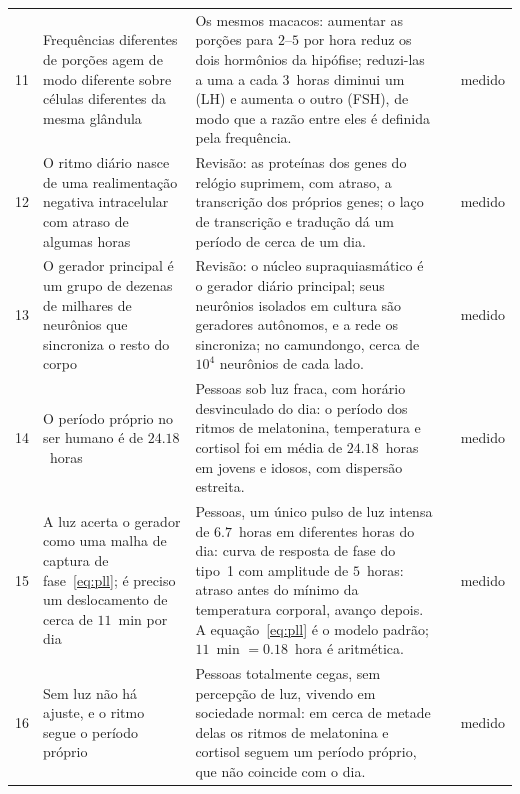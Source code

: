 {\begin{longtable}{>{\raggedright}p{0.5cm}>{\raggedright}p{4.0cm}>{\raggedright}p{5.6cm}>{\raggedright}p{2.3cm}>{\raggedright\arraybackslash}p{1.7cm}}
11 & Frequências diferentes de porções agem de modo diferente sobre células diferentes da mesma glândula & Os mesmos macacos: aumentar as porções para $2$--$5$ por hora reduz os dois hormônios da hipófise; reduzi-las a uma a cada $3$~horas diminui um (LH) e aumenta o outro (FSH), de modo que a razão entre eles é definida pela frequência. & \cite{Wildt1981gnrh} & medido \\
12 & O ritmo diário nasce de uma realimentação negativa intracelular com atraso de algumas horas & Revisão: as proteínas dos genes do relógio suprimem, com atraso, a transcrição dos próprios genes; o laço de transcrição e tradução dá um período de cerca de um dia. & \cite{TakahashiJS2017} & medido \\
13 & O gerador principal é um grupo de dezenas de milhares de neurônios que sincroniza o resto do corpo & Revisão: o núcleo supraquiasmático é o gerador diário principal; seus neurônios isolados em cultura são geradores autônomos, e a rede os sincroniza; no camundongo, cerca de $10^4$ neurônios de cada lado. & \cite{Welsh2010scn} & medido \\
14 & O período próprio no ser humano é de $24.18$~horas & Pessoas sob luz fraca, com horário desvinculado do dia: o período dos ritmos de melatonina, temperatura e cortisol foi em média de $24.18$~horas em jovens e idosos, com dispersão estreita. & \cite{Czeisler1999} & medido \\
15 & A luz acerta o gerador como uma malha de captura de fase~\eqref{eq:pll}; é preciso um deslocamento de cerca de $11$~min por dia & Pessoas, um único pulso de luz intensa de $6.7$~horas em diferentes horas do dia: curva de resposta de fase do tipo~1 com amplitude de $5$~horas: atraso antes do mínimo da temperatura corporal, avanço depois. A equação~\eqref{eq:pll} é o modelo padrão; $11$~min $=0.18$~hora é aritmética. & \cite{Khalsa2003prc} & medido \\
16 & Sem luz não há ajuste, e o ritmo segue o período próprio & Pessoas totalmente cegas, sem percepção de luz, vivendo em sociedade normal: em cerca de metade delas os ritmos de melatonina e cortisol seguem um período próprio, que não coincide com o dia. & \cite{Sack1992blind} & medido \\
\bottomrule
\end{longtable}}
